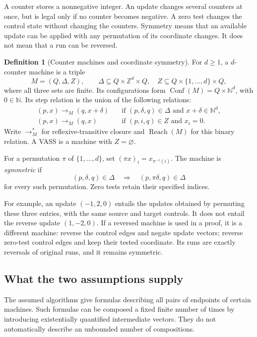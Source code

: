\documentclass[11pt,a4paper]{article}
\theoremstyle{definition}
\newtheorem{definition}[theorem]{Definition}
\theoremstyle{remark}
\newcommand{\N}{\mathbb N}
\newcommand{\Z}{\mathbb Z}
\newcommand{\Reach}{\operatorname{Reach}}
\begin{document}
A counter stores a nonnegative integer. An update changes several
counters at once, but is legal only if no counter becomes negative.
A zero test changes the control state without changing the counters.
Symmetry means that an available update can be applied with any
permutation of its coordinate changes. It does not mean that a run can
be reversed.

\begin{definition}[Counter machines and coordinate symmetry]
\label{def:machine}
For \(d\ge1\), a \(d\)-counter machine is a triple
\[
 M=(Q,\Delta,Z),
 \qquad
 \Delta\subseteq Q\times\Z^d\times Q,\quad
 Z\subseteq Q\times\{1,\ldots,d\}\times Q,
\]
where all three sets are finite. Its configurations form
\(\operatorname{Conf}(M)=Q\times\N^d\), with \(0\in\N\).
Its step relation is the union of the following relations:
\[
\begin{split}
 (p,x)\longrightarrow_M(q,x+\delta)
 &\quad\text{if }(p,\delta,q)\in\Delta
                 \text{ and }x+\delta\in\N^d,\\
 (p,x)\longrightarrow_M(q,x)
 &\quad\text{if }(p,i,q)\in Z\text{ and }x_i=0.
\end{split}
\]
Write \(\longrightarrow_M^*\) for reflexive-transitive closure and
\(\Reach(M)\) for this binary relation. A VASS is a machine with
\(Z=\varnothing\).

For a permutation \(\pi\) of \(\{1,\ldots,d\}\), set
\((\pi x)_i=x_{\pi^{-1}(i)}\). The machine is \emph{symmetric} if
\[
 (p,\delta,q)\in\Delta
 \quad\Longrightarrow\quad
 (p,\pi\delta,q)\in\Delta
\]
for every such permutation. Zero tests retain their specified indices.
\end{definition}

For example, an update \((-1,2,0)\) entails the updates obtained by
permuting these three entries, with the same source and target controls.
It does not entail the reverse update \((1,-2,0)\).
If a reversed machine is used in a proof, it is a different machine:
reverse the control edges and negate update vectors; reverse zero-test
control edges and keep their tested coordinate. Its runs are exactly
reversals of original runs, and it remains symmetric.

\subsection{What the two assumptions supply}

The assumed algorithms give formulas describing all pairs of endpoints
of certain machines. Such formulas can be composed a fixed finite
number of times by introducing existentially quantified intermediate
vectors. They do not automatically describe an unbounded number of
compositions.
\end{document}

